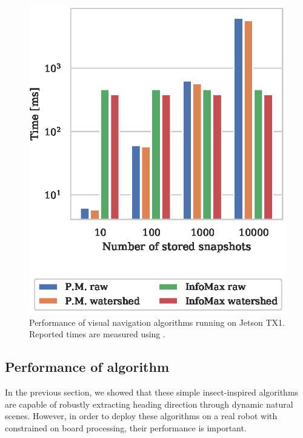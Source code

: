 \documentclass[letterpaper]{article}
\begin{document}
\begin{figure}[t]
    \centering
    \includegraphics{figures/jetson_test_performance.eps}
    \caption{Performance of visual navigation algorithms running on Jetson TX1. Reported times are measured using .}
    \label{jetson_test_performance}
\end{figure}

\subsection{Performance of algorithm}
In the previous section, we showed that these simple insect-inspired algorithms are capable of robustly extracting heading direction through dynamic natural scenes. 
However, in order to deploy these algorithms on a real robot with constrained on board processing, their performance is important. 
\end{document}
